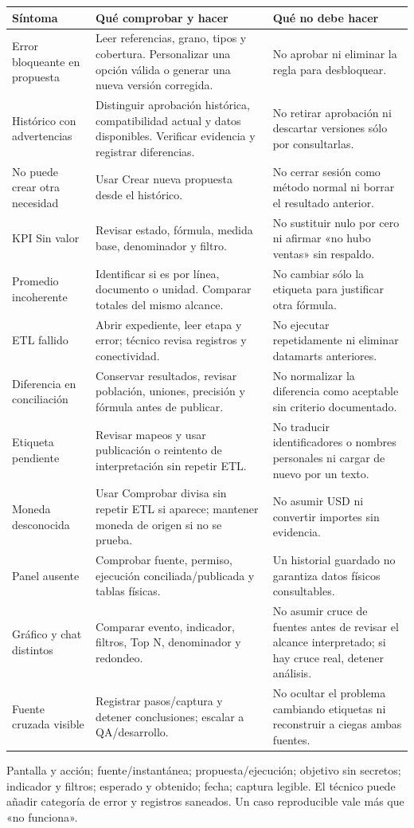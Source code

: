 {\small
\begin{tabularx}{\linewidth}{@{}p{29mm}YY@{}}
\toprule
\textbf{Síntoma}&\textbf{Qué comprobar y hacer}&\textbf{Qué no debe hacer}\\
\midrule
Error bloqueante en propuesta&Leer referencias, grano, tipos y cobertura. Personalizar una opción válida o generar una nueva versión corregida.&No aprobar ni eliminar la regla para desbloquear.\\
Histórico con advertencias&Distinguir aprobación histórica, compatibilidad actual y datos disponibles. Verificar evidencia y registrar diferencias.&No retirar aprobación ni descartar versiones sólo por consultarlas.\\
No puede crear otra necesidad&Usar Crear nueva propuesta desde el histórico.&No cerrar sesión como método normal ni borrar el resultado anterior.\\
KPI Sin valor&Revisar estado, fórmula, medida base, denominador y filtro.&No sustituir nulo por cero ni afirmar «no hubo ventas» sin respaldo.\\
Promedio incoherente&Identificar si es por línea, documento o unidad. Comparar totales del mismo alcance.&No cambiar sólo la etiqueta para justificar otra fórmula.\\
ETL fallido&Abrir expediente, leer etapa y error; técnico revisa registros y conectividad.&No ejecutar repetidamente ni eliminar datamarts anteriores.\\
Diferencia en conciliación&Conservar resultados, revisar población, uniones, precisión y fórmula antes de publicar.&No normalizar la diferencia como aceptable sin criterio documentado.\\
Etiqueta pendiente&Revisar mapeos y usar publicación o reintento de interpretación sin repetir ETL.&No traducir identificadores o nombres personales ni cargar de nuevo por un texto.\\
Moneda desconocida&Usar Comprobar divisa sin repetir ETL si aparece; mantener moneda de origen si no se prueba.&No asumir USD ni convertir importes sin evidencia.\\
Panel ausente&Comprobar fuente, permiso, ejecución conciliada/publicada y tablas físicas.&Un historial guardado no garantiza datos físicos consultables.\\
Gráfico y chat distintos&Comparar evento, indicador, filtros, Top N, denominador y redondeo.&No asumir cruce de fuentes antes de revisar el alcance interpretado; si hay cruce real, detener análisis.\\
Fuente cruzada visible&Registrar pasos/captura y detener conclusiones; escalar a QA/desarrollo.&No ocultar el problema cambiando etiquetas ni reconstruir a ciegas ambas fuentes.\\
\bottomrule
\end{tabularx}}
Pantalla y acción; fuente/instantánea; propuesta/ejecución; objetivo sin secretos; indicador y filtros; esperado y obtenido; fecha; captura legible. El técnico puede añadir categoría de error y registros saneados. Un caso reproducible vale más que «no funciona».

